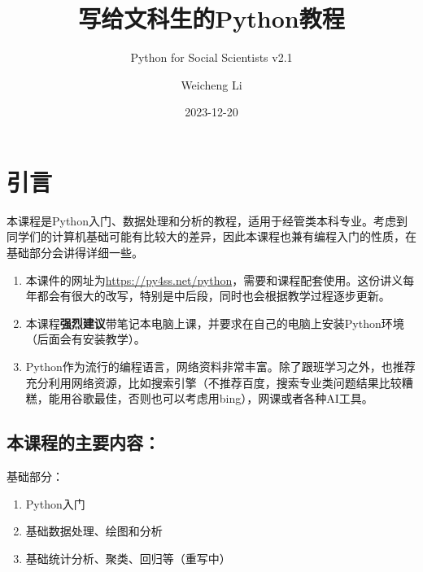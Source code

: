 \documentclass[
  letterpaper,
  DIV=11,
  numbers=noendperiod]{scrreprt}
\title{写给文科生的Python教程}
\subtitle{Python for Social Scientists v2.1}
\author{Weicheng Li}
\date{2023-12-20}
\providecommand{\tightlist}{%
  \setlength{\itemsep}{0pt}\setlength{\parskip}{0pt}}\usepackage{longtable,booktabs,array}
\renewcommand*\contentsname{Table of contents}
\newcommand\contentsname{Table of contents}
\begin{document}
\maketitle
\ifdefined\Shaded\renewenvironment{Shaded}{\begin{tcolorbox}[frame hidden, enhanced, borderline west={3pt}{0pt}{shadecolor}, sharp corners, interior hidden, breakable, boxrule=0pt]}{\end{tcolorbox}}\fi

\renewcommand*\contentsname{Table of contents}
{
\hypersetup{linkcolor=}
\setcounter{tocdepth}{2}
\tableofcontents
}

\hypertarget{ux5f15ux8a00}{%
\chapter*{引言}\label{ux5f15ux8a00}}


本课程是Python入门、数据处理和分析的教程，适用于经管类本科专业。考虑到同学们的计算机基础可能有比较大的差异，因此本课程也兼有编程入门的性质，在基础部分会讲得详细一些。

\begin{enumerate}
\def\labelenumi{\arabic{enumi}.}
\tightlist
\item
  本课件的网址为\url{https://py4ss.net/python}，需要和课程配套使用。这份讲义每年都会有很大的改写，特别是中后段，同时也会根据教学过程逐步更新。
\item
  本课程\textbf{强烈建议}带笔记本电脑上课，并要求在自己的电脑上安装Python环境（后面会有安装教学）。
\item
  Python作为流行的编程语言，网络资料非常丰富。除了跟班学习之外，也推荐充分利用网络资源，比如搜索引擎（不推荐百度，搜索专业类问题结果比较糟糕，能用谷歌最佳，否则也可以考虑用bing），网课或者各种AI工具。
\end{enumerate}

\hypertarget{ux672cux8bfeux7a0bux7684ux4e3bux8981ux5185ux5bb9}{%
\section*{本课程的主要内容：}\label{ux672cux8bfeux7a0bux7684ux4e3bux8981ux5185ux5bb9}}


基础部分：

\begin{enumerate}
\def\labelenumi{\arabic{enumi}.}
\tightlist
\item
  Python入门
\item
  基础数据处理、绘图和分析
\item
  基础统计分析、聚类、回归等（重写中）
\end{enumerate}
\end{document}
